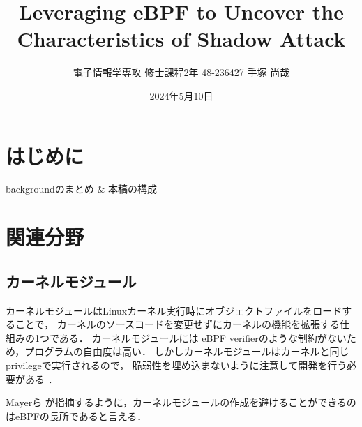\documentclass[platex,a4j,10pt,twoside,twocolumn,dvipdfmx]{jsarticle}
\title{Leveraging eBPF to Uncover the Characteristics of Shadow Attack}
\author{電子情報学専攻 修士課程2年 48-236427 手塚 尚哉}
\date{2024年5月10日}
\begin{document}


\section{はじめに}
backgroundのまとめ \& 本稿の構成


    
\section{関連分野}
  \subsection{カーネルモジュール}
  カーネルモジュールはLinuxカーネル実行時にオブジェクトファイルをロードすることで，
  カーネルのソースコードを変更せずにカーネルの機能を拡張する仕組みの1つである．
  カーネルモジュールには eBPF verifierのような制約がないため，プログラムの自由度は高い．
  しかしカーネルモジュールはカーネルと同じprivilegeで実行されるので，
  脆弱性を埋め込まないように注意して開発を行う必要がある \cite{chen2011linux}．

  Mayerら \cite{mayer2021performance}が指摘するように，カーネルモジュールの作成を避けることができるのはeBPFの長所であると言える．
  
\end{document}
